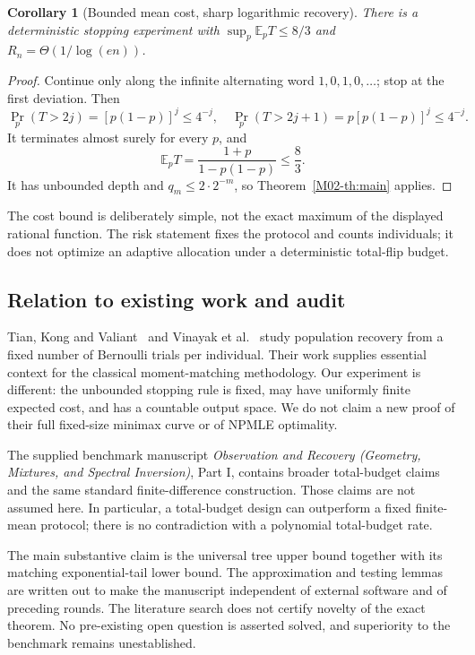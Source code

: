 \documentclass[11pt,a4paper]{article}
\newtheorem{corollary}[theorem]{Corollary}
\theoremstyle{definition}\newtheorem{definition}[theorem]{Definition}
\theoremstyle{remark}\newtheorem{remark}[theorem]{Remark}
\newcommand{\E}{\mathbb E}\newcommand{\one}{\mathbf 1}\newcommand{\1}{\mathbf 1}
\numberwithin{equation}{section}
\begin{document}
\begin{corollary}[Bounded mean cost, sharp logarithmic recovery]
There is a deterministic stopping experiment with $\sup_p\E_pT\le8/3$ and $R_n=\Theta(1/\log(en))$.
\end{corollary}
\begin{proof}
Continue only along the infinite alternating word $1,0,1,0,\ldots$; stop at the first deviation. Then
\[
 \Pr_p(T>2j)=[p(1-p)]^j\le4^{-j},\quad
 \Pr_p(T>2j+1)=p[p(1-p)]^j\le4^{-j}.
\]
It terminates almost surely for every $p$, and
\[
 \E_pT=\frac{1+p}{1-p(1-p)}\le\frac83.
\]
It has unbounded depth and $q_m\le2\cdot2^{-m}$, so Theorem~\ref{M02-th:main} applies.
\end{proof}
The cost bound is deliberately simple, not the exact maximum of the displayed rational function. The risk statement fixes the protocol and counts individuals; it does not optimize an adaptive allocation under a deterministic total-flip budget.

\subsection{Relation to existing work and audit}\label{M02-sec-5}
Tian, Kong and Valiant~\cite{ref014} and Vinayak et al.~\cite{ref015} study population recovery from a fixed number of Bernoulli trials per individual. Their work supplies essential context for the classical moment-matching methodology. Our experiment is different: the unbounded stopping rule is fixed, may have uniformly finite expected cost, and has a countable output space. We do not claim a new proof of their full fixed-size minimax curve or of NPMLE optimality.

The supplied benchmark manuscript \emph{Observation and Recovery (Geometry, Mixtures, and Spectral Inversion)}, Part I, contains broader total-budget claims and the same standard finite-difference construction. Those claims are not assumed here. In particular, a total-budget design can outperform a fixed finite-mean protocol; there is no contradiction with a polynomial total-budget rate.

The main substantive claim is the universal tree upper bound together with its matching exponential-tail lower bound. The approximation and testing lemmas are written out to make the manuscript independent of external software and of preceding rounds. The literature search does not certify novelty of the exact theorem. No pre-existing open question is asserted solved, and superiority to the benchmark remains unestablished.
\end{document}
